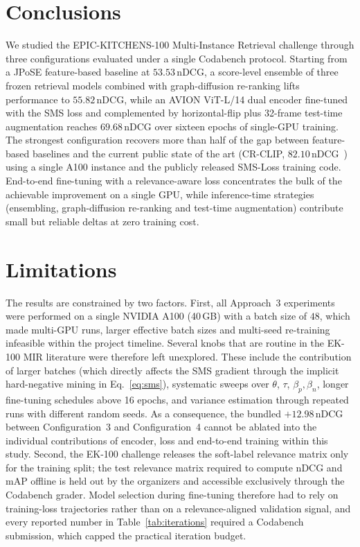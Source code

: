 \section{Conclusions}
\label{sec:conclusions}

We studied the EPIC-KITCHENS-100 Multi-Instance Retrieval challenge through three configurations evaluated under a single Codabench protocol. Starting from a JPoSE feature-based baseline at $53.53$\,nDCG, a score-level ensemble of three frozen retrieval models combined with graph-diffusion re-ranking lifts performance to $55.82$\,nDCG, while an AVION ViT-L/14 dual encoder fine-tuned with the SMS loss and complemented by horizontal-flip plus 32-frame test-time augmentation reaches $69.68$\,nDCG over sixteen epochs of single-GPU training. The strongest configuration recovers more than half of the gap between feature-based baselines and the current public state of the art (CR-CLIP, $82.10$\,nDCG~\cite{he2025crclip}) using a single A100 instance and the publicly released SMS-Loss training code. End-to-end fine-tuning with a relevance-aware loss concentrates the bulk of the achievable improvement on a single GPU, while inference-time strategies (ensembling, graph-diffusion re-ranking and test-time augmentation) contribute small but reliable deltas at zero training cost.

\section{Limitations}
\label{sec:limitations}

The results are constrained by two factors. First, all Approach~3 experiments were performed on a single NVIDIA A100 (40\,GB) with a batch size of $48$, which made multi-GPU runs, larger effective batch sizes and multi-seed re-training infeasible within the project timeline. Several knobs that are routine in the EK-100 MIR literature were therefore left unexplored. These include the contribution of larger batches (which directly affects the SMS gradient through the implicit hard-negative mining in Eq.~\eqref{eq:sms}), systematic sweeps over $\theta$, $\tau$, $\beta_p, \beta_n$, longer fine-tuning schedules above 16 epochs, and variance estimation through repeated runs with different random seeds. As a consequence, the bundled $+12.98$\,nDCG between Configuration~3 and Configuration~4 cannot be ablated into the individual contributions of encoder, loss and end-to-end training within this study. Second, the EK-100 challenge releases the soft-label relevance matrix only for the training split; the test relevance matrix required to compute nDCG and mAP offline is held out by the organizers and accessible exclusively through the Codabench grader. Model selection during fine-tuning therefore had to rely on training-loss trajectories rather than on a relevance-aligned validation signal, and every reported number in Table~\ref{tab:iterations} required a Codabench submission, which capped the practical iteration budget.

